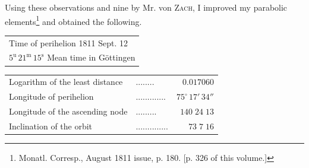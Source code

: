 \par\indent Using these observations and nine by Mr. von \textsc{Zach}, I improved my parabolic elements\footnote{Monatl. Corresp., August 1811 issue, p. 180. [p. 326 of this volume.]} and obtained the following.
\begin{center}\fontsize{10}{12}\selectfont\setlength{\tabcolsep}{4pt}\renewcommand{\arraystretch}{1.15}\begin{tabular}{l}
Time of perihelion 1811 Sept. 12\\
\quad $5^{\mathrm u}\,21^{\mathrm m}\,15^{\mathrm s}$ Mean time in Göttingen\\
\end{tabular}\end{center}
\begin{center}\fontsize{10}{12}\selectfont\setlength{\tabcolsep}{4pt}\renewcommand{\arraystretch}{1.15}\begin{tabular}{llr}
Logarithm of the least distance & .\;.\;.\;.\;.\;.\;.\;. & $0.017060$\\
Longitude of perihelion & .\;.\;.\;.\;.\;.\;.\;.\;.\;.\;.\;.\;. & $75^\circ\,17'\,34''$\\
Longitude of the ascending node & .\;.\;.\;.\;.\;.\;.\;.\;. & $140\;24\;13$\\
Inclination of the orbit & .\;.\;.\;.\;.\;.\;.\;.\;.\;.\;.\;.\;.\;. & $73\;7\;16$\\
\end{tabular}\end{center}

